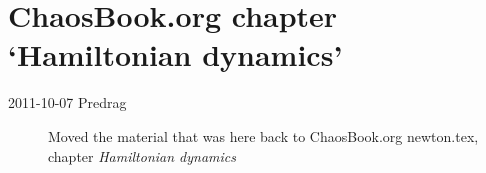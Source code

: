 \section{ChaosBook.org chapter `Hamiltonian dynamics'}
\label{sect:toCB}

\begin{description}
\item[2011-10-07 Predrag]
Moved the material that was here back to ChaosBook.org newton.tex,
chapter {\em Hamiltonian dynamics}

\end{description}

\renewcommand{\LieEl}{\ensuremath{\gamma}}  %
\renewcommand{\ssp}{a}
